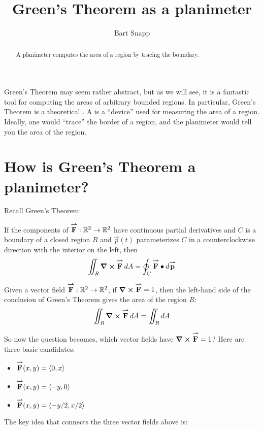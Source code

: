 \documentclass{ximera}
\author{Bart Snapp}
\title[Dig-In:]{Green's Theorem as a planimeter}
\begin{document}
\begin{abstract}
  A planimeter computes the area of a region by tracing the boundary.
\end{abstract}
\maketitle

Green's Theorem may seem rather abstract, but as we will see, it is a
fantastic tool for computing the areas of arbitrary bounded
regions. In particular, Green's Theorem is a theoretical
. A
 is a ``device'' used for measuring the area of a
region. Ideally, one would ``trace'' the border of a region, and the
planimeter would tell you the area of the region.


\section{How is Green's Theorem a planimeter?}

Recall Green's Theorem:
\begin{theorem}
  If the components of ${\overset{\boldsymbol{\rightharpoonup}}{\mathbf{F}}}:\mathbb R^2\to\mathbb R^2$ have continuous partial
  derivatives and $C$ is a boundary of a closed region $R$ and
  $\vec{p}(t)$ parameterizes $C$ in a counterclockwise direction with
  the interior on the left, then
  \[
  \iint_R \boldsymbol\nabla\boldsymbol\times{\overset{\boldsymbol{\rightharpoonup}}{\mathbf{F}}}\mathop{}\!d A = \oint_C {\overset{\boldsymbol{\rightharpoonup}}{\mathbf{F}}}\bullet\mathop{}\!d{\overset{\boldsymbol{\rightharpoonup}}{\mathbf{p}}} 
  \]
\end{theorem}

Given a vector field ${\overset{\boldsymbol{\rightharpoonup}}{\mathbf{F}}}:\mathbb R^2\to\mathbb R^2$, if $\boldsymbol\nabla\boldsymbol\times{\overset{\boldsymbol{\rightharpoonup}}{\mathbf{F}}} = 1$,
then the left-hand side of the conclusion of Green's Theorem gives the
area of the region $R$:
\[
\iint_R \boldsymbol\nabla\boldsymbol\times{\overset{\boldsymbol{\rightharpoonup}}{\mathbf{F}}}\mathop{}\!d A = \iint_R \mathop{}\!d A
\]

So now the question becomes, which vector fields have $\boldsymbol\nabla\boldsymbol\times{\overset{\boldsymbol{\rightharpoonup}}{\mathbf{F}}} =
1$? Here are three basic candidates:
\begin{itemize}
\item ${\overset{\boldsymbol{\rightharpoonup}}{\mathbf{F}}}(x,y) = \left\langle 0,x\right\rangle$
\item ${\overset{\boldsymbol{\rightharpoonup}}{\mathbf{F}}}(x,y) = \left\langle -y,0\right\rangle$
\item ${\overset{\boldsymbol{\rightharpoonup}}{\mathbf{F}}}(x,y) = \left\langle -y/2,x/2\right\rangle$
\end{itemize}
\begin{question}
  The key idea that connects the three vector fields above is:
  \begin{selectAll}
  \end{selectAll}
\end{question}
\end{document}
